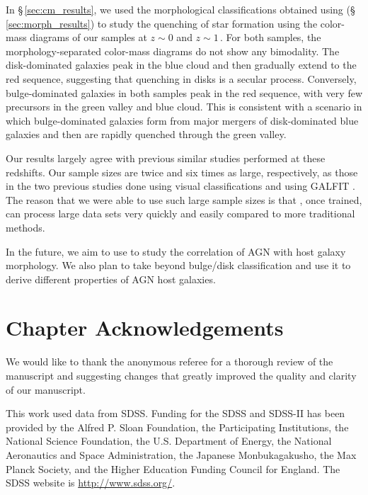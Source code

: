 In \S\,\ref{sec:cm_results}, we used the morphological classifications obtained using \gamornet{} (\S\,\ref{sec:morph_results}) to study the quenching of star formation using the color-mass diagrams of our samples at $z\sim0$ and $z\sim1$\,. For both samples, the morphology-separated color-mass diagrams do not show any bimodality. The disk-dominated galaxies peak in the blue cloud and then gradually extend to the red sequence, suggesting that quenching in disks is a secular process. Conversely, bulge-dominated galaxies in both samples peak  in  the  red  sequence,  with  very few precursors in the green valley and blue cloud. This is consistent with a scenario in which bulge-dominated galaxies form from major mergers of disk-dominated blue galaxies and then are rapidly quenched through the green valley.

Our results largely agree with previous similar studies performed at these redshifts. Our sample sizes are twice and six times as large, respectively, as those in the two previous studies done using visual classifications \citep{Schawinski2014TheGalaxies} and using GALFIT \citep{powell_17}. The reason that we were able to use such large sample sizes is that \gamornet{}, once trained, can process large data sets very quickly and easily compared to more traditional methods.

In the future, we aim to use \gamornet{} to study the correlation of AGN with host galaxy morphology. We also plan to take \gamornet{} beyond bulge/disk classification and use it to derive different properties of AGN host galaxies. 

\section*{Chapter Acknowledgements}
We would like to thank the anonymous referee for a thorough review of the manuscript and suggesting changes that greatly improved the quality and clarity of our manuscript.

This work used data from SDSS. Funding for the SDSS and SDSS-II has been provided by the Alfred P. Sloan Foundation, the Participating Institutions, the National Science Foundation, the U.S. Department of Energy, the National Aeronautics and Space Administration, the Japanese Monbukagakusho, the Max Planck Society, and the Higher Education Funding Council for England. The SDSS website is \href{http://www.sdss.org/}{http://www.sdss.org/}.

